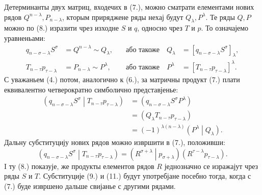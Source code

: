 \documentclass[11pt]{article}
\newcommand{\pair}[2]{\left(#1\middle|#2\right)}
\begin{document}
Детерминанты двух матриц, входечих в (7.), можно сматрати елементами нових рядов $Q^{n-\lambda},P_{n-\lambda}$, кторым приряджене ряды нехај будут $Q_\lambda,P^\lambda$. Те ряды $Q,P$ можно по (8.) изразити чрез изходне $S$ и $q$, односно чрез $T$ и $p$. То означајемо уравненьами:
\begin{equation}
\begin{aligned}
 q_{n-\sigma-\lambda}S^\sigma&=Q^{n-\lambda}\sim Q_\lambda,
 &\quad\text{або такоже}\quad Q_\lambda&=[q_{n-\sigma-\lambda}S^\sigma]_\lambda,\\
 T_{n-\tau}p_{\tau-\lambda}&=P_{n-\lambda}\sim P^\lambda,
 &\quad\text{або такоже}\quad P^\lambda&=[T_{n-\tau}p_{\tau-\lambda}]^\lambda.
\end{aligned}
\tag{9}
\end{equation}
С уважаньем (4.) потом, аналогично к (6.), за матричны продукт (7.) плати еквивалентно четверократно симболично представјенье:
\begin{equation}
\begin{aligned}
\pair{q_{n-\sigma-\lambda}S^\sigma}{T_{n-\tau}p_{\tau-\lambda}}
&=(q_{n-\sigma-\lambda}S^\sigma P^\lambda)\\
&=(Q_\lambda T_{n-\tau}p_{\tau-\lambda})\\
&=(-1)^{\lambda(n-\lambda)}\pair{P^\lambda}{Q_\lambda}.
\end{aligned}
\tag{10}
\end{equation}
Дальну субституцију нових рядов можно извршити в (7.), положивши:
\begin{equation}
 \pair{q_{n-\sigma-\lambda}S^\sigma}{T_{n-\tau}p_{\tau-\lambda}}
 =\pair{R^{\sigma+\lambda}}{p_{\sigma+\lambda}}(R^{\tau-\lambda}p_{\tau-\lambda}).
\tag{11}
\end{equation}
I ту (8.) показује, же продукты елементов рядов $R$ једнозначно се изражајут чрез ряды $S$ и $T$. Субституције (9.) и (11.) будут употребјане посебно тогда, когда с (7.) буде извршено дальше свијанье с другими рядами.
\end{document}
